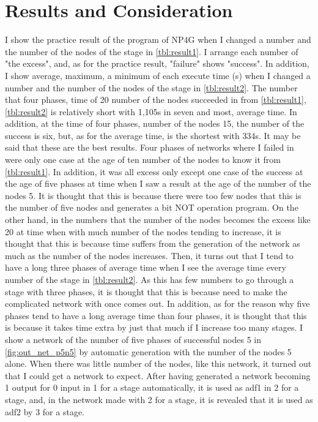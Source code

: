 \documentclass{article}
\begin{document}
\section {Results and Consideration}
I show the practice result of the program of NP4G when I changed a number and the number of the nodes of the stage in \ref{tbl:result1}.
I arrange each number of "the excess", and, as for the practice result, "failure" shows "success".
In addition, I show average, maximum, a minimum of each execute time (s) when I changed a number and the number of the nodes of the stage in \ref{tbl:result2}.
The number that four phases, time of 20 number of the nodes succeeded in from \ref{tbl:result1}, \ref{tbl:result2} is relatively short with 1,105s in seven and most, average time.
In addition, at the time of four phases, number of the nodes 15, the number of the success is six, but, as for the average time, is the shortest with 334s.
It may be said that these are the best results.
Four phases of networks where I failed in were only one case at the age of ten number of the nodes to know it from \ref{tbl:result1}.
In addition, it was all excess only except one case of the success at the age of five phases at time when I saw a result at the age of the number of the nodes 5.
It is thought that this is because there were too few nodes that this is the number of five nodes and generates a bit NOT operation program.
On the other hand, in the numbers that the number of the nodes becomes the excess like 20 at time when with much number of the nodes tending to increase, it is thought that this is because time suffers from the generation of the network as much as the number of the nodes increases.
Then, it turns out that I tend to have a long three phases of average time when I see the average time every number of the stage in \ref{tbl:result2}.
As this has few numbers to go through a stage with three phases, it is thought that this is because need to make the complicated network with once comes out.
In addition, as for the reason why five phases tend to have a long average time than four phases, it is thought that this is because it takes time extra by just that much if I increase too many stages.
I show a network of the number of five phases of successful nodes 5 in \ref{fig:out_net_p5n5} by automatic generation with the number of the nodes 5 alone.
When there was little number of the nodes, like this network, it turned out that I could get a network to expect.
After having generated a network becoming 1 output for 0 input in 1 for a stage automatically, it is used as adf1 in 2 for a stage, and, in the network made with 2 for a stage, it is revealed that it is used as adf2 by 3 for a stage.
\end{document}
